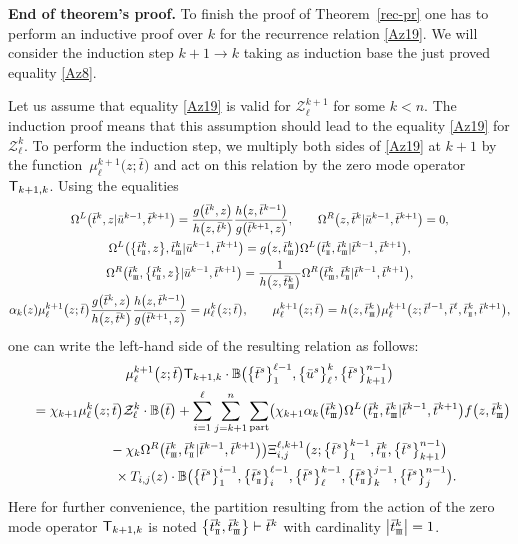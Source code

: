 \documentclass[10pt,a4paper]{amsart}
\newcommand{\st}{\scriptscriptstyle \rm I\hspace{-1pt}I}
\newcommand{\sth}{\scriptscriptstyle \rm I\hspace{-1pt}I\hspace{-1pt}I}
\newcommand{\bu}{\bar u}
\newcommand{\bt}{{\bar t}}
\theoremstyle{definition}
\def\BB{{\mathbb{B}}}
\def\r#1{\eqref{#1}}
\def\sT{{\sf T}}
\def\vk{\chi}
\def\Z{\mathcal{Z}}
\def\Oml{\Omega^L}
\def\Omr{\Omega^R}
\begin{document}
{\bf End of theorem's proof.}
To finish the proof of Theorem~\ref{rec-pr}
one has to perform an inductive proof over $k$ for the recurrence
relation \r{Az19}. We will consider the induction step $k+1\to k$ taking
as induction base the just proved equality \r{Az8}.

Let us assume that equality \r{Az19} is valid for $\Z_{\ell}^{k+1}$ for some $k<n$.
The induction proof means
 that this assumption should lead to the equality \r{Az19} for $\Z_{\ell}^{k}$.
To perform the induction step, we multiply both sides of \r{Az19} at $k+1$ by the function~$\mu^{k+1}_\ell\bigl(z;\bt\bigr)$ and act on this relation by the zero mode operator~$\sT_{k+1,k}$.
Using the equalities
\begin{gather*}
\Oml\bigl(\bt^k,z|\bu^{k-1},\bt^{k+1}\bigr)=\frac{g\bigl(\bt^k,z\bigr)}{h\bigl(z,\bt^k\bigr)}
\frac{h\bigl(z,\bt^{k-1}\bigr)}{g\bigl(\bt^{k+1},z\bigr)} ,\qquad
\Omr\bigl(z,\bt^k|\bu^{k-1},\bt^{k+1}\bigr)=0 ,\\
\Oml\bigl(\bigl\{\bt^k_{\st},z\bigr\},\bt^k_{\sth}|\bu^{k-1},\bt^{k+1}\bigr)=
g\bigl(z,\bt^k_{\sth}\bigr) \Oml\bigl(\bt^k_{\st},\bt^k_{\sth}|\bt^{k-1},\bt^{k+1}\bigr) ,\\
\Omr\bigl(\bt^k_{\sth},\bigl\{\bt^k_{\st},z\bigr\}|\bu^{k-1},\bt^{k+1}\bigr)=
\frac{1}{h\bigl(z,\bt^k_{\sth}\bigr)} \Omr\bigl(\bt^k_{\sth},\bt^k_{\st}|\bt^{k-1},\bt^{k+1}\bigr) ,\\
\alpha_k(z) \mu^{k+1}_\ell\bigl(z;\bt\bigr) \frac{g\bigl(\bt^k,z\bigr)}{h\bigl(z,\bt^k\bigr)}
\frac{h\bigl(z,\bt^{k-1}\bigr)}{g\bigl(\bt^{k+1},z\bigr)}=\mu^k_\ell\bigl(z;\bt\bigr) ,\qquad
\mu^{k+1}_\ell\bigl(z;\bt\bigr)=h\bigl(z,\bt^k_{\sth}\bigr) \mu^{k+1}_\ell\bigl(z;\bt^{l-1},\bt^\ell,\bt^k_{\st},\bt^{k+1}\bigr),
\end{gather*}
one can write the left-hand side of the resulting relation as follows:
\begin{gather}
\mu^{k+1}_\ell\bigl(z;\bt\bigr) \sT_{k+1,k}\cdot
\BB\bigl(\bigl\{\bt^s\bigr\}_{1}^{\ell-1},\bigl\{\bu^s\bigr\}_{\ell}^{k},\bigl\{\bt^s\bigr\}_{k+1}^{n-1}\bigr)\nonumber\\
\qquad
=\vk_{k+1} \mu^k_\ell\bigl(z;\bt\bigr) \Z^k_\ell\cdot\BB\bigl(\bt\bigr)+ \sum_{i=1}^\ell\sum_{j=k+1}^n\sum_{\rm part}
\bigl(\vk_{k+1} \alpha_k\bigl(\bt^k_{\sth}\bigr) \Oml\bigl(\bt^k_{\st},\bt^k_{\sth}|\bt^{k-1},\bt^{k+1}\bigr)
f\bigl(z,\bt^k_{\sth}\bigr)\nonumber\\
\phantom{\qquad
=}{}-\vk_k \Omr\bigl(\bt^k_{\sth},\bt^k_{\st}|\bt^{k-1},\bt^{k+1}\bigr)\bigr) \Xi^{\ell,k+1}_{i,j}\bigl(z;\bigl\{\bt^s\bigr\}_{1}^{k-1},
\bt^k_{\st},\bigl\{\bt^s\bigr\}_{k+1}^{n-1}\bigr)\nonumber\\
\phantom{\qquad
=-}{}\times
T_{i,j}(z)\cdot\BB\bigl(\bigl\{\bt^s\bigr\}_{1}^{i-1},\bigl\{\bt^s_{\st}\bigr\}_{i}^{\ell-1},\bigl\{\bt^s\bigr\}_{\ell}^{k-1},
\bigl\{\bt^s_{\st}\bigr\}_{k}^{j-1},\bigl\{\bt^s\bigr\}_{j}^{n-1}\bigr) .\label{Az20}
\end{gather}
Here for further convenience, the partition resulting from the action of the zero mode operator
$\sT_{k+1,k}$ is noted $\bigl\{\bt^k_{\st},\bt^k_{\sth}\bigr\}\vdash\bt^k$
with cardinality $\big|\bt^k_{\sth}\big|=1$.
\end{document}
